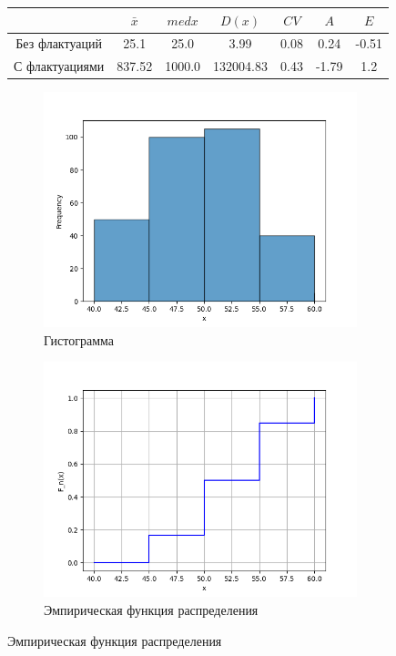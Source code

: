 \documentclass[12pt,a4paper]{article}
\begin{document}
\begin{figure}[htbp!]
		\begin{subtable}[htbp!]{0.8\textwidth}
			\centering
			\begin{tabular}{ |c|c|c|c|c|c|c| }
				\hline
				& \( \bar x \) & \( med x \) & \( D(x) \) & \( CV \) & \( A \) & \( E \) \\
				\hline
				Без флактуаций & 25.1 & 25.0 & 3.99 & 0.08 & 0.24 & -0.51 \\
				\hline
				С флактуациями & 837.52 & 1000.0 & 132004.83 & 0.43 & -1.79 & 1.2 \\
				\hline
			\end{tabular}
		\end{subtable}
	\end{figure}

	\begin{figure}
		\begin{subfigure}[htbp!]{0.8\textwidth}
			\begin{center}
				\includegraphics[width = 0.8\linewidth]{../graphics/2_hist.png}
				\caption{Гистограмма}
			\end{center}
		\end{subfigure}

		\begin{subfigure}[htbp!]{0.8\textwidth}
			\begin{center}
				\includegraphics[width = 0.8\linewidth]{../graphics/2_cdf.png}
				\caption{Эмпирическая функция распределения}
			\end{center}
		\end{subfigure}


\end{figure}
\end{document}
